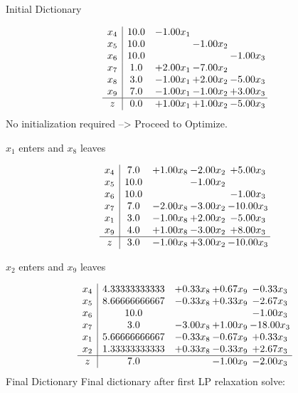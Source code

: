 \documentclass[8pt]{article}
\begin{document}
Initial Dictionary 

\[\begin{array}{c| c c@{\hskip 2pt} c@{\hskip 2pt} c@{\hskip 2pt} }
 x_{4}   &  10.0 & -1.00 x_{1} &    &   \\
 x_{5}   &  10.0  &   & -1.00 x_{2} &   \\
 x_{6}   &  10.0  &    &   & -1.00 x_{3}\\
 x_{7}   &  1.0 & +  2.00 x_{1} & -7.00 x_{2} &   \\
 x_{8}   &  3.0 & -1.00 x_{1} & +  2.00 x_{2} & -5.00 x_{3}\\
 x_{9}   &  7.0 & -1.00 x_{1} & -1.00 x_{2} & +  3.00 x_{3}\\
\hline
z    &  0.0 & +  1.00 x_{1} & +  1.00 x_{2} & -5.00 x_{3}\\
\end{array}\]
No initialization required --> Proceed to Optimize. 


 $ x_{1} $ enters and $ x_{8} $ leaves 

 \[\begin{array}{c| c c@{\hskip 2pt} c@{\hskip 2pt} c@{\hskip 2pt} }
 x_{4}   &  7.0 & +  1.00 x_{8} & -2.00 x_{2} & +  5.00 x_{3}\\
 x_{5}   &  10.0  &   & -1.00 x_{2} &   \\
 x_{6}   &  10.0  &    &   & -1.00 x_{3}\\
 x_{7}   &  7.0 & -2.00 x_{8} & -3.00 x_{2} & -10.00 x_{3}\\
 x_{1}   &  3.0 & -1.00 x_{8} & +  2.00 x_{2} & -5.00 x_{3}\\
 x_{9}   &  4.0 & +  1.00 x_{8} & -3.00 x_{2} & +  8.00 x_{3}\\
\hline
z    &  3.0 & -1.00 x_{8} & +  3.00 x_{2} & -10.00 x_{3}\\
\end{array}\]


 $ x_{2} $ enters and $ x_{9} $ leaves 

 \[\begin{array}{c| c c@{\hskip 2pt} c@{\hskip 2pt} c@{\hskip 2pt} }
 x_{4}   &  4.33333333333 & +  0.33 x_{8} & +  0.67 x_{9} & -0.33 x_{3}\\
 x_{5}   &  8.66666666667 & -0.33 x_{8} & +  0.33 x_{9} & -2.67 x_{3}\\
 x_{6}   &  10.0  &    &   & -1.00 x_{3}\\
 x_{7}   &  3.0 & -3.00 x_{8} & +  1.00 x_{9} & -18.00 x_{3}\\
 x_{1}   &  5.66666666667 & -0.33 x_{8} & -0.67 x_{9} & +  0.33 x_{3}\\
 x_{2}   &  1.33333333333 & +  0.33 x_{8} & -0.33 x_{9} & +  2.67 x_{3}\\
\hline
z    &  7.0  &   & -1.00 x_{9} & -2.00 x_{3}\\
\end{array}\]
Final Dictionary
Final dictionary after first LP relaxation solve: 
\end{document}

